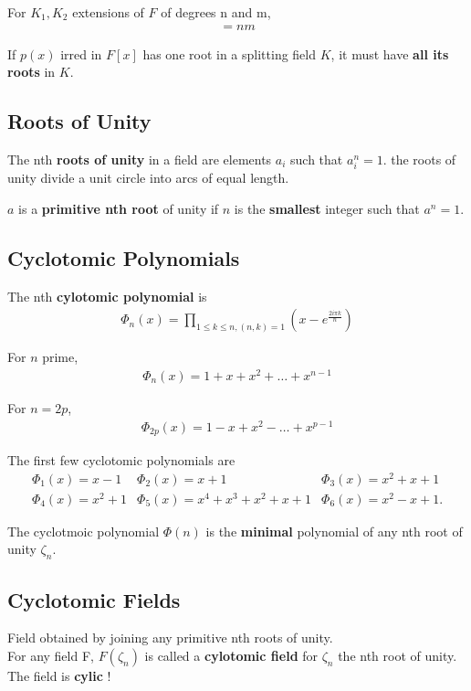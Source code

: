 \documentclass[12pt]{article}
\newcommand{\bt}[1]{\textbf{#1}} %
\newcommand{\eq}[1]{\begin{align*}#1\end{align*}} %
\newcommand{\cb}[1]{\centerline{\fbox{#1}}} %
\begin{document}
For $K_1, K_2$ extensions of $F$ of degrees n and m, 
\eq{[K_1K_2 : F] = nm \tag{if (n, m) = 1}}

If $p(x)$ irred in $F[x]$ has one root in a splitting field $K$, it must have \bt{all its roots} in $K$.




\subsection*{Roots of Unity}
The nth \bt{roots of unity} in a field are elements $a_i$ such that $a_i^n = 1$.
the roots of unity divide a unit circle into arcs of equal length.

$a$ is a \bt{primitive nth root} of unity if $n$ is the \bt{smallest} integer such that $a^n = 1$.

\subsection*{Cyclotomic Polynomials}
The nth \bt{cylotomic polynomial} is
\eq{\Phi_n(x) = \prod_{1 \leq k \leq n, (n, k) = 1} (x - e^{\frac{2i \pi k}{n} })}

For $n$ prime, 
\eq{\Phi_n(x) = 1 + x + x^2 + \dots + x^{n-1}}

For $n = 2p$, 
\eq{\Phi_{2p}(x) = 1 - x + x^2 - \dots + x^{p-1}}

The first few cyclotomic polynomials are
\eq{\Phi_1(x) = x-1 & \Phi_2(x) = x+1 & \Phi_3(x) = x^2 + x + 1\\
\Phi_4(x) = x^2 + 1 & \Phi_5(x) = x^4 + x^3 + x^2 + x +1 & \Phi_6(x) = x^2 -x + 1.
}


\cb{The degree of $\Phi_n(x) = \varphi(n)$}

The cyclotmoic polynomial $\Phi(n)$ is the \bt{minimal} polynomial of any nth root of unity $\zeta_n$.



\subsection*{Cyclotomic Fields}

Field obtained by joining any primitive nth roots of unity.\\
For any field F, $F(\zeta_n)$ is called a \bt{cylotomic field} for $\zeta_n$ the nth root of unity. The field is \bt{cylic} !
\end{document}
